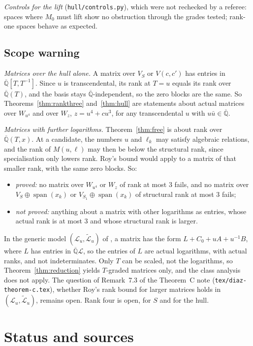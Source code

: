\documentclass[11pt,a4paper]{article}
\theoremstyle{plain}
\theoremstyle{definition}
\newcommand{\Qbar}{\overline{\mathbb{Q}}}
\newcommand{\cL}{\mathcal{L}}
\newcommand{\Lt}{\widetilde{\mathcal{L}}}
\newcommand{\spn}{\operatorname{span}}
\newcommand{\scr}[1]{\nolinkurl{#1}}
\begin{document}
\emph{Controls for the lift} (\scr{hull/controls.py}), which were not rechecked by a referee: spaces where $M_{0}$ must lift show no obstruction through the grades tested; rank-one spaces behave as expected.

\subsection{Scope warning}\label{sec:scope}

\emph{Matrices over the hull alone.} A matrix over $V_{S}$ or $V(c,c')$ has entries in $\Qbar[T,T^{-1}]$. Since $u$ is transcendental, its rank at $T=u$ equals its rank over $\Qbar(T)$, and the basis stays $\Qbar$-independent, so the zero blocks are the same. So Theorems~\ref{thm:rankthree} and~\ref{thm:hull} are statements about actual matrices over $W_{u^{4}}$ and over $W_{z}$, $z=u^{4}+cu^{3}$, for any transcendental $u$ with $u\bar u\in\Qbar$.

\emph{Matrices with further logarithms.} Theorem~\ref{thm:free} is about rank over $\Qbar(T,x)$. At a candidate, the numbers $u$ and $\ell_{k}$ may satisfy algebraic relations, and the rank of $M(u,\ell)$ may then be below the structural rank, since specialisation only lowers rank. Roy's bound would apply to a matrix of that smaller rank, with the same zero blocks. So:
\begin{itemize}
\item \emph{proved:} no matrix over $W_{u^{4}}$ or $W_{z}$ of rank at most $3$ fails, and no matrix over $V_{S}\oplus\spn(x_{k})$ or $V_{S_{1}}\oplus\spn(x_{k})$ of structural rank at most $3$ fails;
\item \emph{not proved:} anything about a matrix with other logarithms as entries, whose actual rank is at most $3$ and whose structural rank is larger.
\end{itemize}
In the generic model $(\cL_{u},\Lt_{u})$ of \cite{TC}, a matrix has the form $L+C_{0}+uA+u^{-1}B$, where $L$ has entries in $\Qbar\cL$, so the entries of $L$ are actual logarithms, with actual ranks, and not indeterminates. Only $T$ can be scaled, not the logarithms, so Theorem~\ref{thm:reduction} yields $T$-graded matrices only, and the class analysis does not apply. The question of Remark~7.3 of the Theorem~C note \cite{TC} (\texttt{tex/diaz-theorem-c.tex}), whether Roy's rank bound for larger matrices holds in $(\cL_{u},\Lt_{u})$, remains open. Rank four is open, for $S$ and for the hull.

\section{Status and sources}\label{sec:status}
\end{document}
